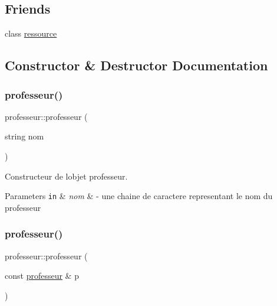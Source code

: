 \subsection*{Friends}
\begin{DoxyCompactItemize}
\item 
class \hyperlink{classprofesseur_a24d55629351652ce27831ce9ef5194c9}{ressource}
\end{DoxyCompactItemize}


\subsection{Constructor \& Destructor Documentation}
\hypertarget{classprofesseur_a3cc95d3ac471e633c318782228a8682e}{}\label{classprofesseur_a3cc95d3ac471e633c318782228a8682e} 
\subsubsection{\texorpdfstring{professeur()}{professeur()}\hspace{0.1cm}{\footnotesize\ttfamily [1/2]}}
{\footnotesize\ttfamily professeur\+::professeur (\begin{DoxyParamCaption}\item[{string}]{nom }\end{DoxyParamCaption})}



Constructeur de l\textquotesingle{}objet professeur. 


\begin{DoxyParams}[1]{Parameters}
\mbox{\tt in}  & {\em nom} & -\/ une chaine de caractere representant le nom du professeur \\
\hline
\end{DoxyParams}
\hypertarget{classprofesseur_a652526233e701be639ecb40a73161039}{}\label{classprofesseur_a652526233e701be639ecb40a73161039} 
\subsubsection{\texorpdfstring{professeur()}{professeur()}\hspace{0.1cm}{\footnotesize\ttfamily [2/2]}}
{\footnotesize\ttfamily professeur\+::professeur (\begin{DoxyParamCaption}\item[{const \hyperlink{classprofesseur}{professeur} \&}]{p }\end{DoxyParamCaption})\hspace{0.3cm}{\ttfamily [default]}}



